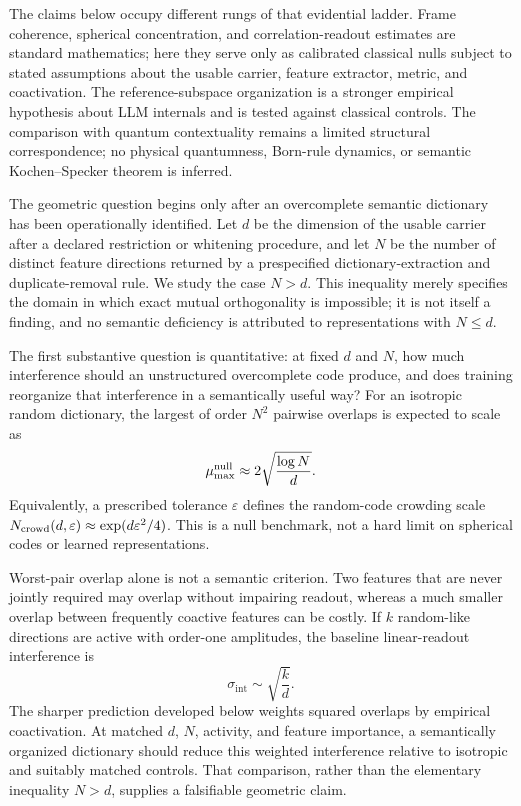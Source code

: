 \documentclass[
  aps,
  reprint,
  superscriptaddress,
  floatfix,
  nofootinbib,
  longbibliography
]{revtex4-2}
\newcommand{\Nsem}{N}
\newcommand{\sint}{\sigma_{\mathrm{int}}}
\begin{document}
The claims below occupy different rungs of that evidential ladder.  Frame
coherence, spherical concentration, and correlation-readout estimates are
standard mathematics; here they serve only as calibrated classical nulls
subject to stated assumptions about the usable carrier, feature extractor,
metric, and coactivation.  The reference-subspace organization is
a stronger empirical hypothesis about LLM internals and is tested against
classical controls.  The comparison with quantum contextuality remains a
limited structural correspondence; no physical quantumness, Born-rule
dynamics, or semantic Kochen--Specker theorem is inferred.

The geometric question begins only after an overcomplete semantic dictionary
has been operationally identified.  Let $d$ be the dimension of the usable
carrier after a declared restriction or whitening procedure, and let $\Nsem$
be the number of distinct feature directions returned by a prespecified
dictionary-extraction and duplicate-removal rule.  We study the case
$\Nsem>d$.  This inequality merely specifies the domain in which exact mutual
orthogonality is impossible; it is not itself a finding, and no semantic
deficiency is attributed to representations with $\Nsem\leq d$.

The first substantive question is quantitative: at fixed $d$ and $\Nsem$,
how much interference should an unstructured overcomplete code produce, and
does training reorganize that interference in a semantically useful way?  For
an isotropic random dictionary, the largest of order $\Nsem^2$ pairwise
overlaps is expected to scale as
%
\begin{equation}
\label{eq:intro-capacity}
\mu_{\max}^{\rm null}
\approx 2\sqrt{\frac{\log\Nsem}{d}}.
\end{equation}
%
Equivalently, a prescribed tolerance $\varepsilon$ defines the random-code
crowding scale
$N_{\rm crowd}(d,\varepsilon)\approx\exp(d\varepsilon^2/4)$.  This is a null
benchmark, not a hard limit on spherical codes or learned representations.

Worst-pair overlap alone is not a semantic criterion.  Two features that are
never jointly required may overlap without impairing readout, whereas a much
smaller overlap between frequently coactive features can be costly.  If $k$
random-like directions are active with order-one amplitudes, the baseline
linear-readout interference is
%
\begin{equation}
\label{eq:intro-readout}
\sint\sim\sqrt{\frac{k}{d}}.
\end{equation}
%
The sharper prediction developed below weights squared overlaps by empirical
coactivation.  At matched $d$, $\Nsem$, activity, and feature importance, a
semantically organized dictionary should reduce this weighted interference
relative to isotropic and suitably matched controls.  That comparison, rather
than the elementary inequality $\Nsem>d$, supplies a falsifiable geometric
claim.
\end{document}
